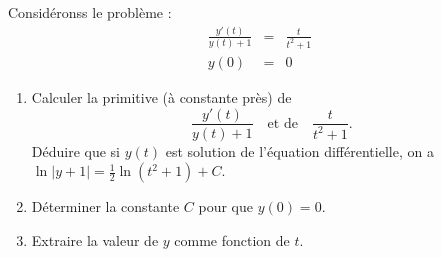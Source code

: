 \begin{exo}

Considéronss le problème  :
 \begin{eqnarray}
          \frac{  y'(t)}{y(t)+1} & = &\frac{t}{t^2+1} \\
            y(0)  & = &  0 \label{cix}
        \end{eqnarray}

\begin{enumerate}
\item Calculer la primitive (à constante près) de $$\frac{y'(t)}{y(t)+1}\quad \text{et de}\quad \frac {t}{t^2+1}.$$
 Déduire que si $y(t)$ est solution  de l'équation différentielle,
on a $\ln |y+1| = \frac12 \ln(t^2+1) + C$.
\item Déterminer la constante $C$ pour que $y(0) = 0$.
\item Extraire la valeur de $y$ comme fonction de $t$.
\end{enumerate}
\end{exo}

\finpoly

